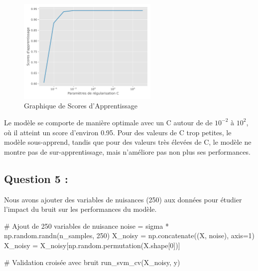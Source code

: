 \documentclass[
  letterpaper,
  DIV=11,
  numbers=noendperiod]{scrartcl}
\newenvironment{Shaded}{\begin{snugshade}}{\end{snugshade}}
\newcommand{\CommentTok}[1]{\textcolor[rgb]{0.37,0.37,0.37}{#1}}
\newcommand{\DecValTok}[1]{\textcolor[rgb]{0.68,0.00,0.00}{#1}}
\newcommand{\NormalTok}[1]{\textcolor[rgb]{0.00,0.23,0.31}{#1}}
\newcommand{\OperatorTok}[1]{\textcolor[rgb]{0.37,0.37,0.37}{#1}}
\begin{document}
\begin{figure}

{\centering \includegraphics[width=0.6\textwidth,height=\textheight]{tp_files/mediabag/graphique_scores_svm.pdf}

}

\caption{Graphique de Scores d'Apprentissage}

\end{figure}

Le modèle se comporte de manière optimale avec un C autour de de
\(10^{-2}\) à \(10^2\), où il atteint un score d'environ 0.95. Pour des
valeurs de C trop petites, le modèle sous-apprend, tandis que pour des
valeurs très élevées de C, le modèle ne montre pas de sur-apprentissage,
mais n'améliore pas non plus ses performances.

\hypertarget{question-5}{%
\subsection{Question 5 :}\label{question-5}}

Nous avons ajouter des variables de nuisances (250) aux données pour
étudier l'impact du bruit sur les performances du modèle.

\begin{Shaded}
\begin{Highlighting}[]
\CommentTok{\# Ajout de 250 variables de nuisance}
\NormalTok{noise }\OperatorTok{=}\NormalTok{ sigma }\OperatorTok{*}\NormalTok{ np.random.randn(n\_samples, }\DecValTok{250}\NormalTok{)}
\NormalTok{X\_noisy }\OperatorTok{=}\NormalTok{ np.concatenate((X, noise), axis}\OperatorTok{=}\DecValTok{1}\NormalTok{)}
\NormalTok{X\_noisy }\OperatorTok{=}\NormalTok{ X\_noisy[np.random.permutation(X.shape[}\DecValTok{0}\NormalTok{])]}

\CommentTok{\# Validation croisée avec bruit}
\NormalTok{run\_svm\_cv(X\_noisy, y)}
\end{Highlighting}
\end{Shaded}
\end{document}
